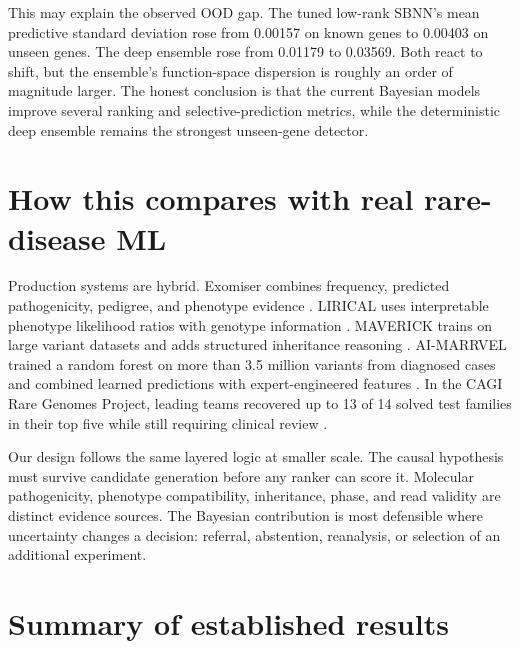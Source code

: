 \documentclass[11pt]{article}
\begin{document}
This may explain the observed OOD gap. The tuned low-rank SBNN's mean predictive standard deviation rose from 0.00157 on known genes to 0.00403 on unseen genes. The deep ensemble rose from 0.01179 to 0.03569. Both react to shift, but the ensemble's function-space dispersion is roughly an order of magnitude larger. The honest conclusion is that the current Bayesian models improve several ranking and selective-prediction metrics, while the deterministic deep ensemble remains the strongest unseen-gene detector.
\section{How this compares with real rare-disease ML}

Production systems are hybrid. Exomiser combines frequency, predicted pathogenicity, pedigree, and phenotype evidence \citep{exomiser2015}. LIRICAL uses interpretable phenotype likelihood ratios with genotype information \citep{lirical2020}. MAVERICK trains on large variant datasets and adds structured inheritance reasoning \citep{maverick2023}. AI-MARRVEL trained a random forest on more than 3.5 million variants from diagnosed cases and combined learned predictions with expert-engineered features \citep{aimarrvel2024}. In the CAGI Rare Genomes Project, leading teams recovered up to 13 of 14 solved test families in their top five while still requiring clinical review \citep{stenton2024}.

Our design follows the same layered logic at smaller scale. The causal hypothesis must survive candidate generation before any ranker can score it. Molecular pathogenicity, phenotype compatibility, inheritance, phase, and read validity are distinct evidence sources. The Bayesian contribution is most defensible where uncertainty changes a decision: referral, abstention, reanalysis, or selection of an additional experiment.
\section{Summary of established results}
\end{document}
